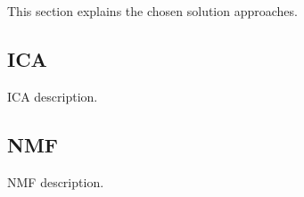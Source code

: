\documentclass[../main.tex]{subfiles} %
\begin{document}
This section explains the chosen solution approaches.

\subsection{ICA}

ICA description.

\subsection{NMF}

NMF description.	
\end{document}
